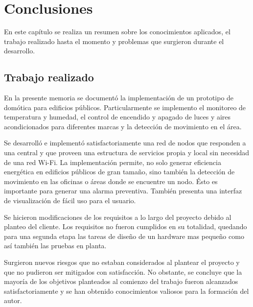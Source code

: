 
\chapter{Conclusiones} %

\label{Chapter5} %

En este capítulo se realiza un resumen sobre los conocimientos aplicados, el trabajo realizado hasta el momento y problemas que surgieron durante el desarrollo.



\section{Trabajo realizado }

En la presente memoria se documentó la implementación de un prototipo de domótica para edificios públicos. Particularmente se implemento el monitoreo de temperatura y humedad, el control de encendido y apagado de luces y aires acondicionados para diferentes marcas y la detección de movimiento en el área.

Se desarrolló e implementó satisfactoriamente una red de nodos que responden a una central y que proveen una estructura de servicios propia y local sin necesidad de una red Wi-Fi. La implementación permite, no solo generar eficiencia energética en edificios públicos de gran tamaño, sino también la detección de movimiento en las oficinas o áreas donde se encuentre un nodo. Ésto es importante para generar una alarma preventiva. También presenta una interfaz de visualización de fácil uso para el usuario.

Se hicieron modificaciones de los requisitos a lo largo del proyecto debido al planteo del cliente. Los requisitos no fueron cumplidos en su totalidad, quedando para una segunda etapa las tareas de diseño de un hardware mas pequeño como así también las pruebas en planta.

Surgieron nuevos riesgos que no estaban considerados al plantear el proyecto y que no pudieron ser mitigados con satisfacción. No obstante, se concluye que la mayoría de los objetivos planteados al comienzo del trabajo fueron alcanzados satisfactoriamente y se han obtenido conocimientos valiosos para la formación del autor.



